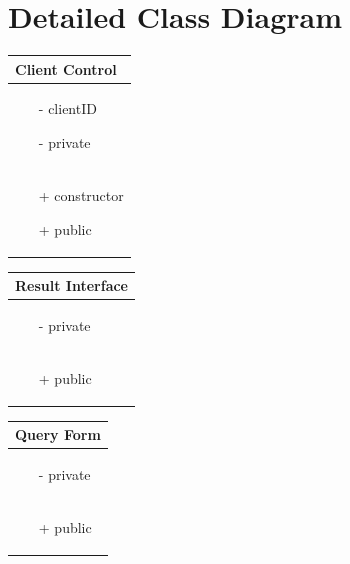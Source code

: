 \documentclass[]{article}
\begin{document}
\section{Detailed Class Diagram}
\label{sec:detailed_class_diagram}
\begin{table}[H]
\centering %
\begin{tabular}{|>{\centering\arraybackslash}p{10cm}|} %
\hline
Client Control\\
\hline
\begin{itemize}
\item[-] clientID
\item[-] private
\end{itemize}
\\
\hline
\begin{itemize}
\item[+] constructor
\item[+] public
\end{itemize}
\\
\hline
\end{tabular}
\end{table}
%
\begin{table}[H]
\centering
\begin{tabular}{|>{\centering\arraybackslash}p{10cm}|}
\hline
Result Interface\\
\hline
\begin{itemize}
\item[-] private
\end{itemize}
\\
\hline
\begin{itemize}
\item[+] public
\end{itemize}
\\
\hline
\end{tabular}
\end{table}
%
\begin{table}[H]
\centering
\begin{tabular}{|>{\centering\arraybackslash}p{10cm}|}
\hline
Query Form\\
\hline
\begin{itemize}
\item[-] private
\end{itemize}
\\
\hline
\begin{itemize}
\item[+] public
\end{itemize}
\\
\hline
\end{tabular}
\end{table}
\end{document}
